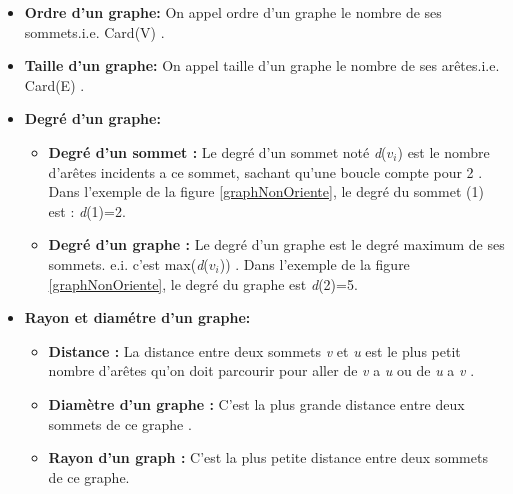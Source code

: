 		\begin{itemize}[label=$\circ$]
			
			\item \textbf{Ordre d'un graphe:} On appel ordre d’un 					graphe le nombre de ses sommets.i.e. Card(V) \citep{DUT}.
			
			\item  \textbf{Taille d'un graphe:} On appel taille d’un 				graphe le nombre de ses arêtes.i.e. Card(E) \citep{DUT}.
			
			\item  \textbf{Degré d'un graphe:}
			
			
			\begin{itemize}[label=$\bullet$]
				\item \textbf{Degré d'un sommet : } Le degré d’un sommet noté \textit{d}($\textit{v}_{i}$) est le nombre d'arêtes incidents a ce sommet, sachant qu’une boucle compte pour 2 \citep{muller} . Dans l'exemple de la figure \ref{graphNonOriente}, le degré du sommet (1) est : \textit{d}(1)=2.
				
				\item \textbf{Degré d'un graphe : }Le degré d’un graphe est 			le degré maximum de ses sommets. e.i. c’est 						max(\textit{d}($\textit{v}_{i}$)) \citep{muller}. Dans l’exemple de 				la figure \ref{graphNonOriente}, le degré du graphe est \textit{d}(2)=5.
			\end{itemize}
			
			\item \textbf{Rayon et diamétre d'un graphe:}
			\begin{itemize}[label=$\bullet$]
				\item \textbf{Distance : }La distance entre deux sommets 	\textit{v} et \textit{u} est le plus petit nombre d’arêtes qu’on doit parcourir pour aller de \textit{v} a \textit{u} ou de \textit{u} a \textit{v} \citep{muller}. 
				
				\item 	\textbf{Diamètre d’un graphe :} C’est la plus grande 	distance entre deux sommets de ce graphe \citep{muller}. 
				
				\item 	\textbf{Rayon d’un graph : }C’est la plus petite distance entre deux sommets de ce graphe. 
			\end{itemize}
		\end{itemize}
		
	
			
		
		
	